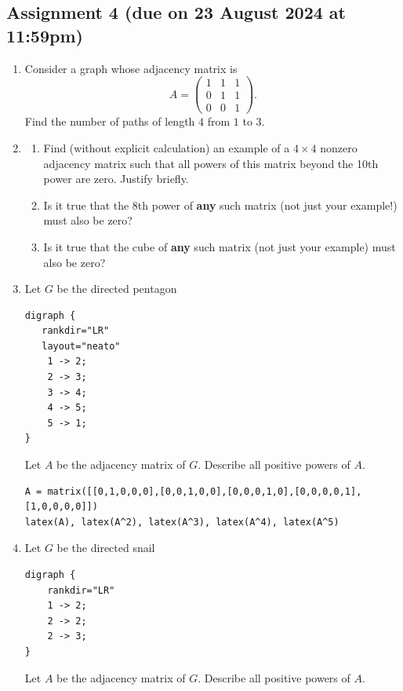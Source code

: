 \documentclass{amsart}
\begin{document}
\subsection{Assignment 4 (due on 23 August 2024 at 11:59pm)}
\label{sec:org94e389f}
\togglefalse{solutions}

\begin{enumerate}
\item Consider a graph whose adjacency matrix is
\[A = \begin{pmatrix}1&1&1\\0&1&1\\0&0&1\end{pmatrix}.\]
Find the number of paths of length \(4\) from \(1\) to \(3\).

\item \begin{enumerate}
\item Find (without explicit calculation) an example of a \(4 \times 4\) nonzero adjacency matrix such that all powers of this matrix beyond the 10th power are zero. Justify briefly.
\item Is it true that the 8th power of \textbf{any} such matrix (not just your example!) must also be zero?
\item Is it true that the cube of \textbf{any} such matrix (not just your example) must also be zero?
\end{enumerate}

\item Let \(G\) be the directed pentagon
\begin{verbatim}
digraph {
   rankdir="LR"
   layout="neato"
    1 -> 2;
    2 -> 3;
    3 -> 4;
    4 -> 5;
    5 -> 1;
}
\end{verbatim}

Let \(A\) be the adjacency matrix of \(G\).
Describe all positive powers of \(A\).

\begin{verbatim}
A = matrix([[0,1,0,0,0],[0,0,1,0,0],[0,0,0,1,0],[0,0,0,0,1],[1,0,0,0,0]])
latex(A), latex(A^2), latex(A^3), latex(A^4), latex(A^5)
\end{verbatim}

\item Let \(G\) be the directed snail
\begin{verbatim}
digraph {
    rankdir="LR"
    1 -> 2;
    2 -> 2;
    2 -> 3;
}
\end{verbatim}

Let \(A\) be the adjacency matrix of \(G\).
Describe all positive powers of \(A\).


\end{enumerate}
\end{document}
